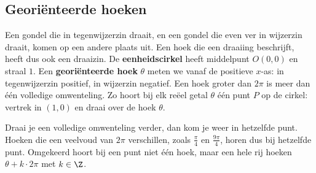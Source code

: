 \subsection{Georiënteerde hoeken}

Een gondel die in tegenwijzerzin draait, en een gondel die even ver in wijzerzin draait, komen op een andere plaats uit. Een hoek die een draaiing beschrijft, heeft dus ook een draaizin. De \textbf{eenheidscirkel} heeft middelpunt $O(0, 0)$ en straal $1$. Een \textbf{georiënteerde hoek} $\theta$ meten we vanaf de positieve $x$-as: in tegenwijzerzin positief, in wijzerzin negatief. Een hoek groter dan $2\pi$ is meer dan één volledige omwenteling. Zo hoort bij elk reëel getal $\theta$ één punt $P$ op de cirkel: vertrek in $(1, 0)$ en draai over de hoek $\theta$.


Draai je een volledige omwenteling verder, dan kom je weer in hetzelfde punt. Hoeken die een veelvoud van $2\pi$ verschillen, zoals $\frac{\pi}{4}$ en $\frac{9\pi}{4}$, horen dus bij hetzelfde punt. Omgekeerd hoort bij een punt niet één hoek, maar een hele rij hoeken $\theta + k \cdot 2\pi$ met $k \in \Z$.

